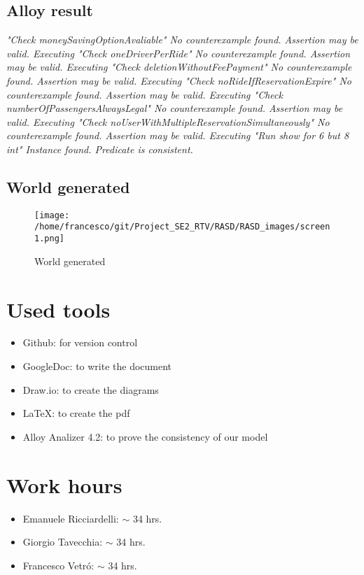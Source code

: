 \documentclass[10pt, a4paper,titlepage]{article}
\begin{document}
\subsection{Alloy result}
\textit{
"Check moneySavingOptionAvaliable"
No counterexample found. Assertion may be valid.
\newline
\newline
Executing "Check oneDriverPerRide"
No counterexample found. Assertion may be valid.
\newline
\newline
Executing "Check deletionWithoutFeePayment"
No counterexample found. Assertion may be valid.
\newline
\newline
Executing "Check noRideIfReservationExpire"
No counterexample found. Assertion may be valid.
\newline
\newline
Executing "Check numberOfPassengersAlwaysLegal"
No counterexample found. Assertion may be valid.
\newline
\newline
Executing "Check noUserWithMultipleReservationSimultaneously"
No counterexample found. Assertion may be valid.
\newline
\newline
Executing "Run show for 6 but 8 int"
Instance found. Predicate is consistent.
}
\clearpage
\subsection{World generated}
\begin{figure}[!b]
\texttt{[image: /home/francesco/git/Project\_SE2\_RTV/RASD/RASD\_images/screen1.png]}
\caption{World generated}
\label{fig:World generated}
\end{figure}
\clearpage
{}
\section*{Used tools}
\begin{itemize}
\item Github: for version control
\item GoogleDoc: to write the document
\item Draw.io: to create the diagrams
\item \LaTeX: to create the pdf
\item Alloy Analizer 4.2: to prove the consistency of our model 
\end{itemize}
\section*{Work hours} 
\begin{itemize}
\item Emanuele Ricciardelli: $\sim$ 34 hrs.
\item Giorgio Tavecchia: $\sim$ 34 hrs.
\item Francesco Vetr\'o: $\sim$ 34 hrs.
\end{itemize}
\end{document}
